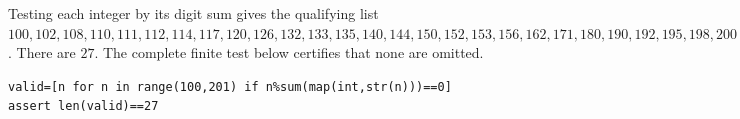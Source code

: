 Testing each integer by its digit sum gives the qualifying list $100,102,108,110,111,112,114,117,120,126,132,133,135,140,144,150,152,153,156,162,171,180,190,192,195,198,200$. There are $\boxed{27}$. The complete finite test below certifies that none are omitted.\begin{verbatim}
valid=[n for n in range(100,201) if n%sum(map(int,str(n)))==0]
assert len(valid)==27
\end{verbatim}
